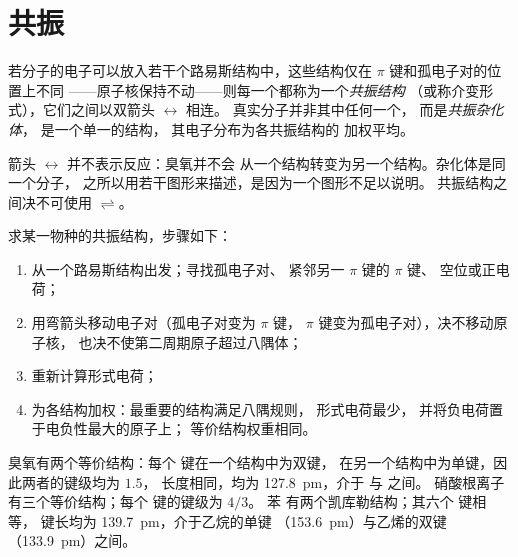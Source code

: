 \section{共振}

\begin{definition}[共振结构与共振杂化体]\label{def:b1:lewis-resonance-vsepr:resonance}
若分子的电子可以放入若干个路易斯结构中，这些结构仅在 $\pi$ 键和孤电子对的位置上不同
——原子核保持不动——则每一个都称为一个\emph{共振结构}
（或称介变形式），它们之间以双箭头 $\leftrightarrow$ 相连。
真实分子并非其中任何一个，
而是\emph{共振杂化体}，
是一个单一的结构，
其电子分布为各共振结构的
加权平均。
\end{definition}

\begin{remark}\label{rem:b1:lewis-resonance-vsepr:arrow}
箭头 $\leftrightarrow$ 并不表示反应：臭氧并不会
从一个结构转变为另一个结构。杂化体是同一个分子，
之所以用若干图形来描述，是因为一个图形不足以说明。
共振结构之间决不可使用 $\rightleftharpoons$。
\end{remark}

\begin{method}[书写与加权共振结构]\label{met:b1:lewis-resonance-vsepr:resonance}
求某一物种的共振结构，步骤如下：
\begin{enumerate}
  \item 从一个路易斯结构出发；寻找孤电子对、
        紧邻另一 $\pi$ 键的 $\pi$ 键、
        空位或正电荷；
  \item 用弯箭头移动电子对（孤电子对变为 $\pi$ 键，
        $\pi$ 键变为孤电子对），决不移动原子核，
        也决不使第二周期原子超过八隅体；
  \item 重新计算形式电荷；
  \item 为各结构加权：最重要的结构满足八隅规则，
        形式电荷最少，
        并将负电荷置于电负性最大的原子上；
        等价结构权重相同。
\end{enumerate}
\end{method}

\begin{example}[臭氧、硝酸根与苯]\label{ex:b1:lewis-resonance-vsepr:examples}
臭氧有两个等价结构：每个  键在一个结构中为双键，
在另一个结构中为单键，因此两者的键级均为 $1.5$，
长度相同，均为 \qty{127.8}{pm}，介于  与  之间。
硝酸根离子  有三个等价结构；每个  键的键级为 $4/3$。
苯  有两个凯库勒结构；其六个  键相等，
键长均为 \qty{139.7}{pm}，介于乙烷的单键
（\qty{153.6}{pm}）与乙烯的双键（\qty{133.9}{pm}）之间。
\end{example}

